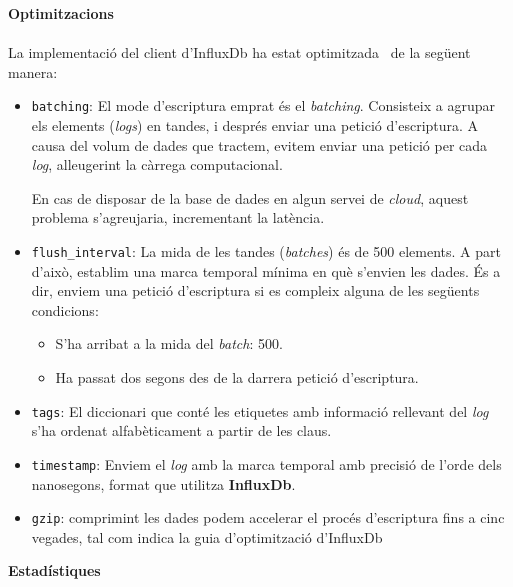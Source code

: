 \clearpage

\noindent
\textbf{Optimitzacions} \\ \\

\noindent
La implementació del client d'InfluxDb ha estat optimitzada~\cite{influxdb:optimizations} de la següent manera:

\begin{itemize}
    \item \texttt{batching}: El mode d'escriptura emprat és el \textit{batching}.
    Consisteix a agrupar els elements (\textit{\gls{log}s}) en tandes, i després enviar una petició d'escriptura.
    A causa del volum de dades que tractem, evitem enviar una petició per cada \textit{log}, alleugerint la càrrega computacional.
    \begin{tcolorbox}[colback=red!5!white, colframe=red!75!black, title=Sobrecàrrega]
    En cas de disposar de la base de dades en algun servei de \textit{cloud}, aquest problema s'agreujaria, incrementant la latència.
    \end{tcolorbox}
    \item \texttt{flush\_interval}: La mida de les tandes (\textit{batches}) és de 500 elements.
    A part d’això, establim una marca temporal mínima en què s’envien les dades.
    És a dir, enviem una petició d’escriptura si es compleix alguna de les següents condicions:
    \begin{itemize}
        \item S’ha arribat a la mida del \textit{batch}: 500.
        \item Ha passat dos segons des de la darrera petició d’escriptura.
    \end{itemize}
    \item \texttt{tags}: El diccionari que conté les etiquetes amb informació rellevant del \textit{\gls{log}} s’ha ordenat alfabèticament a partir de les claus.
    \item \texttt{\gls{timestamp}}: Enviem el \textit{\gls{log}} amb la marca temporal amb precisió de l’orde dels nanosegons, format que utilitza \textbf{InfluxDb}.
    \item \texttt{\gls{gzip}}: comprimint les dades podem accelerar el procés d’escriptura fins a cinc vegades, tal com indica la guia d'optimització d'InfluxDb~\cite{influxdb:optimizations}
\end{itemize}

\clearpage

\noindent
\textbf{Estadístiques} \\ \\

